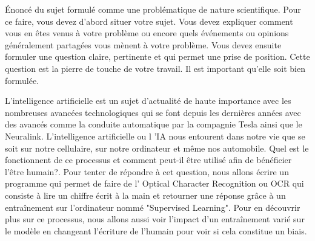 Énoncé du sujet formulé comme une problématique de nature scientifique. Pour ce faire, vous devez
d’abord situer votre sujet. Vous devez expliquer comment vous en êtes venus à votre problème ou encore
quels événements ou opinions généralement partagées vous mènent à votre problème. Vous devez ensuite
formuler une question claire, pertinente et qui permet une prise de position. Cette question est la pierre
de touche de votre travail. Il est important qu’elle soit bien formulée. 

L'intelligence artificielle est un sujet d'actualité de haute importance avec les nombreuses avancées 
technologiques qui se font depuis les dernières années avec des avancés comme la conduite automatique par la compagnie Tesla ainsi que le Neuralink. L'intelligence artificielle ou l 'IA nous entourent dans notre vie que se soit sur notre cellulaire, sur notre ordinateur
et même nos automobile. Quel est le fonctionnent de ce processus et comment peut-il être utilisé afin de bénéficier l’être humain?. 
Pour tenter de répondre à cet question, nous allons écrire un programme qui permet de faire de l' Optical Character Recognition ou OCR 
qui consiste à lire un chiffre écrit à la main et retourner une réponse grâce à un entraînement sur l'ordinateur 
nommé "Supervised Learning". Pour en découvrir plus sur ce processus, nous allons aussi voir l'impact d'un 
entraînement varié sur le modèle en changeant l'écriture de l'humain pour voir si cela constitue un biais.

